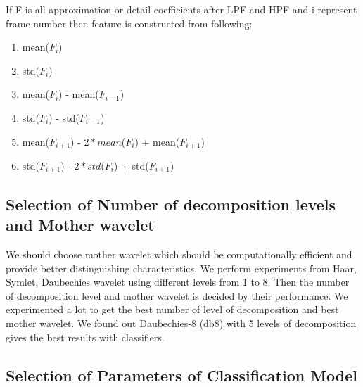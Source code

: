 \documentclass[11pt]{report}
\begin{document}
If F is all approximation or detail coefficients after LPF and HPF and i represent frame number then feature is constructed from following:
\begin{enumerate}
\item mean($F_i$)
\item std($F_i$)
\item mean($F_i$) - mean($F_{i-1}$)
\item std($F_i$) - std($F_{i-1}$)
\item mean($F_{i+1}$) - $2*mean$($F_{i}$) + mean($F_{i+1}$)
\item std($F_{i+1}$) - $2*std$($F_{i}$) + std($F_{i+1}$) 
\end{enumerate} 
 
\subsection{Selection of Number of decomposition levels and Mother  wavelet}
We should choose mother wavelet which should be computationally efficient and provide better distinguishing characteristics. We perform experiments from Haar, Symlet, Daubechies wavelet using different levels from 1 to 8. Then the number of decomposition level and mother wavelet is decided by their performance. We experimented a lot to get the best number of level of decomposition and best mother wavelet. We found out Daubechies-8 (db8) with 5 levels of decomposition gives the best results with classifiers.

\subsection{Selection of Parameters of Classification Model}
\end{document}
